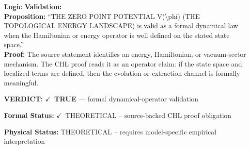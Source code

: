 \textbf{Logic Validation:}\\
\textbf{Proposition:} ``THE ZERO POINT POTENTIAL V(\textbackslash{}phi) (THE TOPOLOGICAL ENERGY LANDSCAPE) is valid as a
formal dynamical law when the Hamiltonian or energy operator is well defined on the
stated state space.''\\
\textbf{Proof:} The source statement identifies an energy, Hamiltonian, or vacuum-sector mechanism. The
CHL proof reads it as an operator claim: if the state space and localized terms are
defined, then the evolution or extraction channel is formally meaningful.

\textbf{VERDICT:} \ensuremath{\checkmark}\ \textbf{TRUE} --- formal dynamical-operator validation

\textbf{Formal Status:} \ensuremath{\checkmark}\ THEORETICAL -- source-backed CHL proof obligation

\textbf{Physical Status:} THEORETICAL -- requires model-specific empirical interpretation
\par\vspace{0.45em}
\par
\ifTZPDarkEdition
{}
\fi
\endgroup
\endgroup
